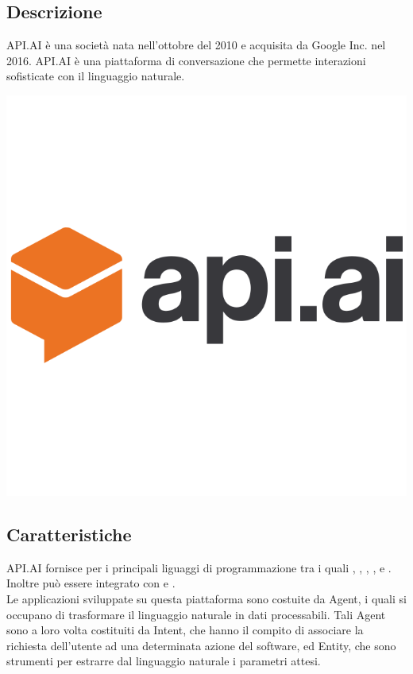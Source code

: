 \documentclass[a4paper,titlepage]{article}
\begin{document}
	\subsection{Descrizione}
	\begin{minipage}{0.7\textwidth}\raggedright
		API.AI è una società nata nell'ottobre del 2010 e acquisita da Google Inc. nel 2016.
		API.AI è una piattaforma di conversazione che permette interazioni sofisticate con il linguaggio naturale.
	\end{minipage}
	\hfill
	\noindent\begin{minipage}{0.1\textwidth}
		\includegraphics[scale=0.15]{images/apiai.png}
	\end{minipage}
	\subsection{Caratteristiche}
	API.AI fornisce  per i principali liguaggi di programmazione tra i quali , , , ,  e . Inoltre può essere integrato con  e .\\
	Le applicazioni sviluppate su questa piattaforma sono costuite da Agent, i quali si occupano di trasformare il linguaggio naturale in dati processabili.
	Tali Agent sono a loro volta costituiti da Intent, che hanno il compito di associare la richiesta dell'utente ad una determinata azione del software, ed Entity, che sono strumenti per estrarre dal linguaggio naturale i parametri attesi.\\
	
\end{document}
